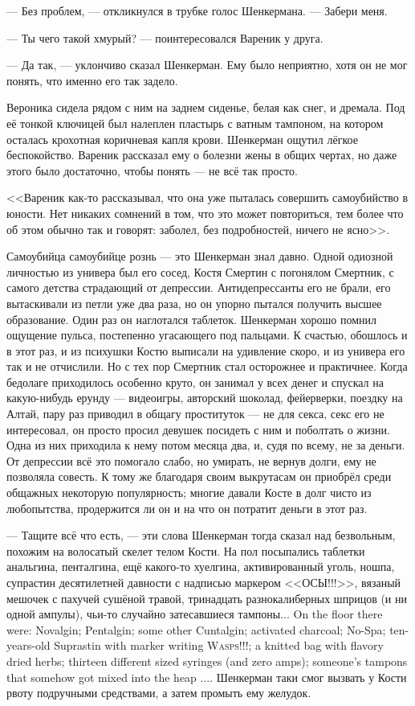 --- Без проблем, --- откликнулся в трубке голос Шенкермана.
--- Забери меня.

--- Ты чего такой хмурый? --- поинтересовался Вареник у друга.

--- Да так, --- уклончиво сказал Шенкерман.
Ему было неприятно, хотя он не мог понять, что именно его так задело.

Вероника сидела рядом с ним на заднем сиденье, белая как снег, и дремала.
Под её тонкой ключицей был налеплен пластырь с ватным тампоном, на котором осталась крохотная коричневая капля крови.
Шенкерман ощутил лёгкое беспокойство.
Вареник рассказал ему о болезни жены в общих чертах, но даже этого было достаточно, чтобы понять --- не всё так просто.

<<Вареник как-то рассказывал, что она уже пыталась совершить самоубийство в юности.
Нет никаких сомнений в том, что это может повториться, тем более что об этом обычно так и говорят: заболел, без подробностей, ничего не ясно>>.

Самоубийца самоубийце рознь --- это Шенкерман знал давно.
Одной одиозной личностью из универа был его сосед, Костя Смертин с погонялом Смертник, с самого детства страдающий от депрессии.
Антидепрессанты его не брали, его вытаскивали из петли уже два раза, но он упорно пытался получить высшее образование.
Один раз он наглотался таблеток.
Шенкерман хорошо помнил ощущение пульса, постепенно угасающего под пальцами.
К счастью, обошлось и в этот раз, и из психушки Костю выписали на удивление скоро, и из универа его так и не отчислили.
Но с тех пор Смертник стал осторожнее и практичнее.
Когда бедолаге приходилось особенно круто, он занимал у всех денег и спускал на какую-нибудь ерунду --- видеоигры, авторский шоколад, фейерверки, поездку на Алтай, пару раз приводил в общагу проституток --- не для секса, секс его не интересовал, он просто просил девушек посидеть с ним и поболтать о жизни.
Одна из них приходила к нему потом месяца два, и, судя по всему, не за деньги.
От депрессии всё это помогало слабо, но умирать, не вернув долги, ему не позволяла совесть.
К тому же благодаря своим выкрутасам он приобрёл среди общажных некоторую популярность;
многие давали Косте в долг чисто из любопытства, продержится ли он и на что он потратит деньги в этот раз.

--- Тащите всё что есть, --- эти слова Шенкерман тогда сказал над безвольным, похожим на волосатый скелет телом Кости.
{На пол посыпались таблетки анальгина, пенталгина, ещё какого-то хуелгина, активированный уголь, ношпа, супрастин десятилетней давности с надписью маркером <<ОСЫ!!!>>, вязаный мешочек с пахучей сушёной травой, тринадцать разнокалиберных шприцов (и ни одной ампулы), чьи-то случайно затесавшиеся тампоны...}
{On the floor there were: Novalgin; Pentalgin; some other Cuntalgin; activated charcoal; No-Spa; ten-years-old Suprastin with marker writing \textsc{Wasps!!!}; a knitted bag with flavory dried herbs; thirteen different sized syringes (and zero amps); someone's tampons that somehow got mixed into the heap ....}
Шенкерман таки смог вызвать у Кости рвоту подручными средствами, а затем промыть ему желудок.

